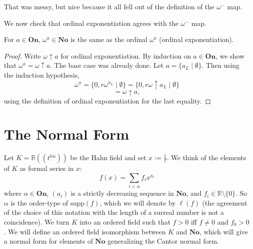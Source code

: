 That was messy, but nice because it all fell out of the definition of the $\omega^-$ map.

We now check that ordinal exponentiation agrees with the $\omega^-$ map.

\begin{lemma} %
For $a\in\mathbf{On}$, $\omega^a\in\mathbf{No}$ is the same as the ordinal $\omega^a$ (ordinal exponentiation).
 \end{lemma}

\begin{proof} %
Write $\omega\uparrow a$ for ordinal exponentiation. By induction on $a\in \mathbf{On}$, we show that $\omega^a=\omega\uparrow a$. The base case was already done. Let $a=\{a_L\mid \emptyset\}$. Then using the induction hypothesis,
$$\omega^a=\{0,r\omega^{a_L}\mid \emptyset\}=\{0,r\omega\uparrow a_L\mid\emptyset\}$$
$$=\omega\uparrow a,$$
using the definition of ordinal exponentiation for the last equality.
 \end{proof}

\section{The Normal Form}

Let $K=\mathbb{R}((t^\mathbb{No}))$ be the Hahn field and set $x:=\frac{1}{t}$. We think of the elements of $K$ as formal series in $x$:
$$f(x)=\sum_{i<\alpha}f_ix^{a_i}$$
where $\alpha\in \mathbf{On}$, $(a_i)$ is a strictly decreasing sequence in $\mathbf{No}$, and $f_i\in \mathbb{R}\setminus \{0\}$. So $\alpha$ is the order-type of $\mathrm{supp}(f)$, which we will denote by $\ell(f)$ (the agreement of the choice of this notation with the length of a surreal number is not a coincidence). We turn $K$ into an ordered field such that $f>0$ iff $f\neq 0$ and $f_0>0$. We will define an ordered field isomorphism between $K$ and $\mathbf{No}$, which will give a normal form for elements of $\mathbf{No}$ generalizing the Cantor normal form.
